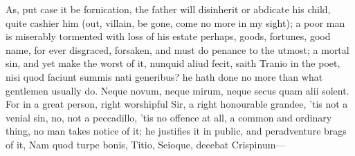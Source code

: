 {As, put case it be fornication, the father will disinherit or abdicate
his child, quite cashier him (out, villain, be gone, come no more in my
sight); a poor man is miserably tormented with loss of his estate
perhaps, goods, fortunes, good name, for ever disgraced, forsaken, and
must do penance to the utmost; a mortal sin, and yet make the worst of
it, nunquid aliud fecit, saith Tranio in the poet, nisi quod
faciunt summis nati generibus? he hath done no more than what gentlemen
usually do. Neque novum, neque mirum, neque secus quam alii
solent. For in a great person, right worshipful Sir, a right honourable
grandee, 'tis not a venial sin, no, not a peccadillo, 'tis no offence
at all, a common and ordinary thing, no man takes notice of it; he
justifies it in public, and peradventure brags of it,
Nam quod turpe bonis, Titio, Seioque, decebat
Crispinum---

}
